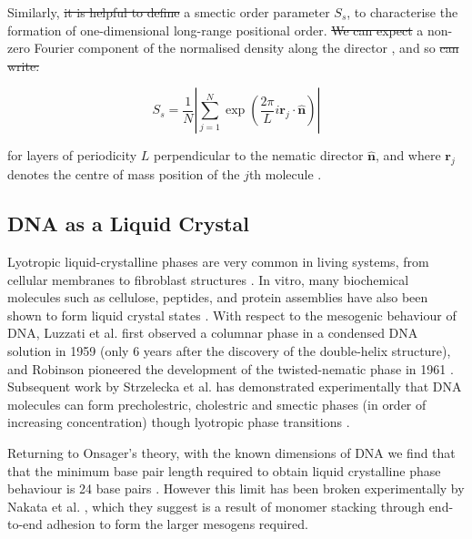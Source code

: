 \documentclass[11pt, a4paper]{article} %
\providecommand{\DIFadd}[1]{{\protect\color{blue}\uwave{#1}}} %
\providecommand{\DIFdel}[1]{{\protect\color{red}\sout{#1}}}                      %
\providecommand{\DIFaddbegin}{} %
\providecommand{\DIFaddend}{} %
\providecommand{\DIFdelbegin}{} %
\providecommand{\DIFdelend}{} %
\begin{document}

Similarly, \DIFdelbegin \DIFdel{it is helpful to define }\DIFdelend \DIFaddbegin \DIFadd{\textcolor{forestgreen}{it is helpful to define} }\DIFaddend a smectic order parameter $S_{s}$, to characterise the formation of one-dimensional long-range positional order. \DIFdelbegin \DIFdel{We can expect }\DIFdelend \DIFaddbegin \DIFadd{\textcolor{forestgreen}{We can expect} }\DIFaddend a non-zero Fourier component of the normalised density along the director \cite{Polson1997}, and so \DIFdelbegin \DIFdel{can write:
}\DIFdelend \DIFaddbegin \DIFadd{we can write
}\DIFaddend 

\begin{equation}
S_{s} = \frac{1}{N} \left\lvert \sum_{j=1}^{N} \exp \left( {\frac{2\pi}{L}i\textbf{r}_{j} \cdot \boldsymbol{\hat{n}}} \right) \right\rvert
\end{equation}

for layers of periodicity $L$ perpendicular to the nematic director $\boldsymbol{\hat{n}}$, and where $\textbf{r}_{j}$ denotes the centre of mass position of the $j$th molecule \cite{Dussi2018}.


\subsection{DNA as a Liquid Crystal} 
Lyotropic liquid-crystalline phases are very common in living systems, from cellular membranes to fibroblast structures \cite{Stewart1966, Rey2013}. In vitro, many biochemical molecules such as cellulose, peptides, and protein assemblies have also been shown to form liquid crystal states \cite{Zhao2019}. With respect to the mesogenic behaviour of DNA, Luzzati et al. first observed a columnar phase in a condensed DNA solution in 1959 (only 6 years after the discovery of the double-helix structure), and Robinson pioneered the development of the twisted-nematic phase in 1961 \cite{Luzzati1959, Robinson1961}. Subsequent work by Strzelecka et al. has demonstrated experimentally that DNA molecules can form precholestric, cholestric and smectic phases (in order of increasing concentration) though lyotropic phase transitions \cite{Strzelecka1988}. 

Returning to Onsager's theory, with the known dimensions of DNA we find that that the minimum base pair length required to obtain liquid crystalline phase behaviour is 24 base pairs \cite{Bolhuis1997}. However this limit has been broken experimentally by Nakata et al. \cite{Nakata2007, Zanchetta2008}, which they suggest is a result of monomer stacking through end-to-end adhesion to form the larger mesogens required.
\end{document}
